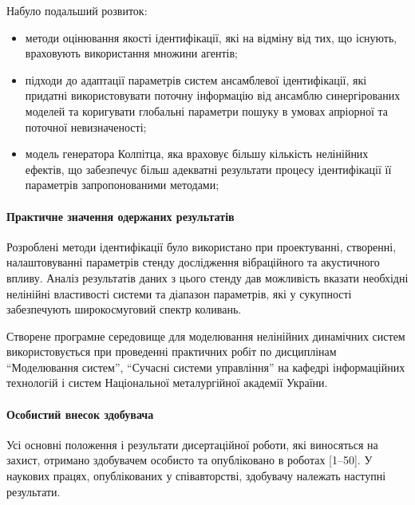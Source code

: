 \noindent
Набуло подальший розвиток:
\begin{itemize}

  \item
  методи оцінювання якості ідентифікації,
  які на відміну від тих, що існують,
  враховують використання множини агентів;

  \item
  підходи до адаптації параметрів систем
  ансамблевої ідентифікації, які придатні використовувати поточну
  інформацію від ансамблю синергірованих моделей та коригувати глобальні
  параметри пошуку в умовах апріорної та поточної невизначеності;

  \item
    модель генератора Колпітца, яка враховує
    більшу кількість нелінійних ефектів,
    що забезпечує більш адекватні результати процесу
    ідентифікації її параметрів запропонованими методами;

\end{itemize}




\paragraph{Практичне значення одержаних результатів}

Розроблені методи ідентифікації було використано
при проектуванні, створенні, налаштовуванні параметрів
стенду дослідження вібраційного та акустичного впливу.
Аналіз результатів даних з цього стенду
дав можливість вказати необхідні нелінійні властивості системи
та діапазон параметрів, які у сукупності
забезпечують широкосмуговий спектр коливань.

Створене програмне середовище для моделювання нелінійних динамічних систем
використовується при проведенні практичних робіт по дисциплінам
``Моделювання систем'',
``Сучасні системи управління'' на кафедрі інформаційних технологій
і систем Національної металургійної академії України.



\paragraph{Особистий внесок здобувача}

Усі основні положення і результати
дисертаційної роботи, які виносяться на захист, отримано здобувачем особисто та
опубліковано в роботах [1--50]. У наукових працях, опублікованих у співавторстві,
здобувачу належать наступні результати.


